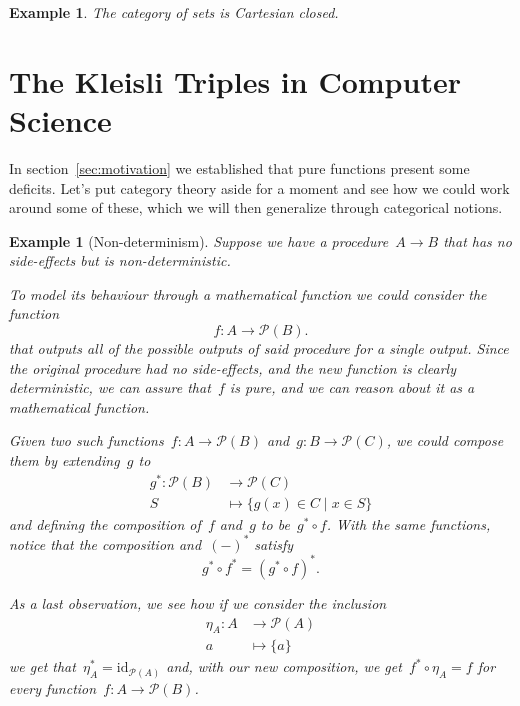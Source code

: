\documentclass[a4paper]{article}
\theoremstyle{plain}
\newtheorem{example}[theorem]{Example}
\theoremstyle{definition}
\newcommand{\id}{\mathrm{id}}
\begin{document}
\begin{example}
    The category of sets is Cartesian closed.
\end{example}

\section{The Kleisli Triples in Computer Science}
In section~\ref{sec:motivation} we established that pure functions present some
deficits. Let's put category theory aside for a moment and see how we could work
around some of these, which we will then generalize through categorical notions.
\begin{example}[Non-determinism]
    \label{ex:kleisli-non-determinism}
    Suppose we have a procedure~\(A\longrightarrow B\) that has no side-effects
    but is non-deterministic.

    To model its behaviour through a mathematical function we could consider the
    function
    \[
        f:A\longrightarrow\mathcal{P}(B).
    \]
    that outputs all of the possible outputs of said procedure for a single
    output. Since the original procedure had no side-effects, and the new
    function is clearly deterministic, we can assure that~\(f\) is pure, and we
    can reason about it as a mathematical function.

    Given two such functions~\(f:A\longrightarrow\mathcal{P}(B)\)
    and~\(g:B\longrightarrow\mathcal{P}(C)\), we could compose them by
    extending~\(g\) to
    \begin{align*}
        g^{\ast}:\mathcal{P}(B)&\longrightarrow\mathcal{P}(C) \\
        S&\longmapsto\{g(x)\in C \mid x\in S\}
    \end{align*}
    and defining the composition of~\(f\) and~\(g\) to be~\(g^{\ast} \circ f\).
    With the same functions, notice that the composition and~\((-)^{\ast}\)
    satisfy
    \[
        g^{\ast}\circ f^{\ast}
        = (g^{\ast} \circ f)^{\ast}.
    \]

    As a last observation, we see how if we consider the inclusion
    \begin{align*}
        \eta_{A}:A&\longrightarrow\mathcal{P}(A) \\
        a&\longmapsto\{a\}
    \end{align*}
    we get that~\(\eta_{A}^{\ast}=\id_{\mathcal{P}(A)}\) and, with our new
    composition, we get~\(f^{\ast}\circ\eta_{A}=f\) for every
    function~\(f:A\longrightarrow\mathcal{P}(B)\).
\end{example}
\end{document}
